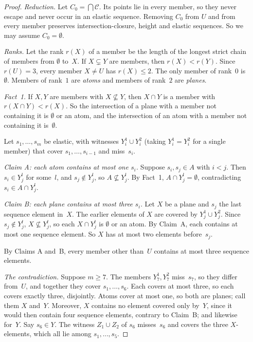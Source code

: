 \begin{proof}
\emph{Reduction.} Let $C_0=\bigcap\mathcal C$. Its points lie in every member, so they never escape and never occur in an elastic sequence. Removing $C_0$ from $U$ and from every member preserves intersection-closure, height and elastic sequences. So we may assume $C_0=\emptyset$.

\emph{Ranks.} Let the rank $r(X)$ of a member be the length of the longest strict chain of members from $\emptyset$ to~$X$. If $X\subsetneq Y$ are members, then $r(X)<r(Y)$. Since $r(U)=3$, every member $X\neq U$ has $r(X)\le2$. The only member of rank~$0$ is~$\emptyset$. Members of rank~$1$ are \emph{atoms} and members of rank~$2$ are \emph{planes}.

\emph{Fact~1.} If $X,Y$ are members with $X\not\subseteq Y$, then $X\cap Y$ is a member with $r(X\cap Y)<r(X)$. So the intersection of a plane with a member not containing it is $\emptyset$ or an atom, and the intersection of an atom with a member not containing it is~$\emptyset$.

Let $s_1,\dots,s_m$ be elastic, with witnesses $Y_i^1\cup Y_i^2$ (taking $Y_i^1=Y_i^2$ for a single member) that cover $s_1,\dots,s_{i-1}$ and miss~$s_i$.

\emph{Claim A: each atom contains at most one $s_i$.} Suppose $s_i,s_j\in A$ with $i<j$. Then $s_i\in Y^l_j$ for some~$l$, and $s_j\notin Y^l_j$, so $A\not\subseteq Y^l_j$. By Fact~1, $A\cap Y^l_j=\emptyset$, contradicting $s_i\in A\cap Y^l_j$.

\emph{Claim B: each plane contains at most three $s_i$.} Let $X$ be a plane and $s_j$ the last sequence element in~$X$. The earlier elements of $X$ are covered by $Y^1_j\cup Y^2_j$. Since $s_j\notin Y^l_j$, $X\not\subseteq Y^l_j$, so each $X\cap Y^l_j$ is $\emptyset$ or an atom. By Claim~A, each contains at most one sequence element. So $X$ has at most two elements before~$s_j$.

By Claims A and~B, every member other than~$U$ contains at most three sequence elements.

\emph{The contradiction.} Suppose $m\ge7$. The members $Y^1_7,Y^2_7$ miss~$s_7$, so they differ from~$U$, and together they cover $s_1,\dots,s_6$. Each covers at most three, so each covers exactly three, disjointly. Atoms cover at most one, so both are planes; call them $X$ and~$Y$. Moreover, $X$ contains no element covered only by~$Y$, since it would then contain four sequence elements, contrary to Claim~B; and likewise for~$Y$. Say $s_6\in Y$. The witness $Z_1\cup Z_2$ of $s_6$ misses~$s_6$ and covers the three $X$-elements, which all lie among $s_1,\dots,s_5$.


\end{proof}
